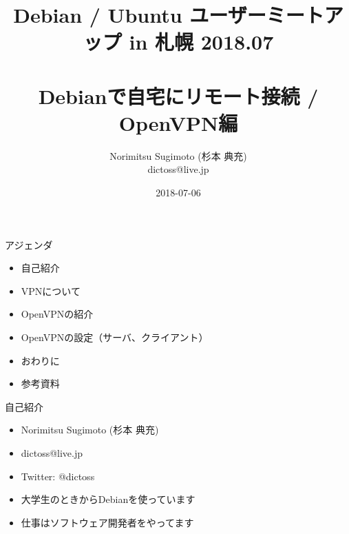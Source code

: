 \title{Debian / Ubuntu ユーザーミートアップ in 札幌 2018.07 \\　\\Debianで自宅にリモート接続 / OpenVPN編}
\subtitle{}
\author{Norimitsu Sugimoto (杉本 典充) \\dictoss@live.jp}
\date{2018-07-06}



\frame{\titlepage{}}


\begin{frame}{アジェンダ}
  \begin{itemize}
  \item 自己紹介
  \item VPNについて
  \item OpenVPNの紹介
  \item OpenVPNの設定（サーバ、クライアント）
  \item おわりに
  \item 参考資料
  \end{itemize}
\end{frame}


\begin{frame}{自己紹介}
  \begin{itemize}
  \item Norimitsu Sugimoto (杉本 典充)
  \item dictoss@live.jp
  \item Twitter: @dictoss
  \item 大学生のときからDebianを使っています
  \item 仕事はソフトウェア開発者をやってます
  \end{itemize}
\end{frame}


